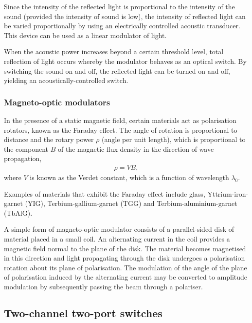 Since the intensity of the reflected light is proportional to the intensity of the sound (provided the intensity of sound is low), the intensity of reflected light can be varied proportionally by using an electrically controlled acoustic transducer. This device can be used as a linear modulator of light.

When the acoustic power increases beyond a certain threshold level, total reflection of light occurs whereby the modulator behaves as an optical switch. By switching the sound on and off, the reflected light can be turned on and off, yielding an acoustically-controlled switch.

%
%

\subsubsection{Magneto-optic modulators} 

In the presence of a static magnetic field, certain materials act as polarisation rotators, known as the Faraday effect. The angle of rotation is proportional to distance and the rotary power $\rho$ (angle per unit length), which is proportional to the component $B$ of the magnetic flux density in the direction of wave propagation,
\begin{align}
	\rho=VB,
\end{align}
where $V$ is known as the Verdet constant, which is a function of wavelength $\lambda_0$.
 
Examples of materials that exhibit the Faraday effect include glass, Yttrium-iron-garnet (YIG), Terbium-gallium-garnet (TGG) and Terbium-aluminium-garnet (TbAlG).

A simple form of magneto-optic modulator consists of a parallel-sided disk of material placed in a small coil. An alternating current in the coil provides a magnetic field normal to the plane of the disk. The material becomes magnetised in this direction and light propagating through the disk undergoes a polarisation rotation about its plane of polarisation. The modulation of the angle of the plane of polarisation induced by the alternating current may be converted to amplitude modulation by subsequently passing the beam through a polariser. 

%
%

\subsection{Two-channel two-port switches} 


